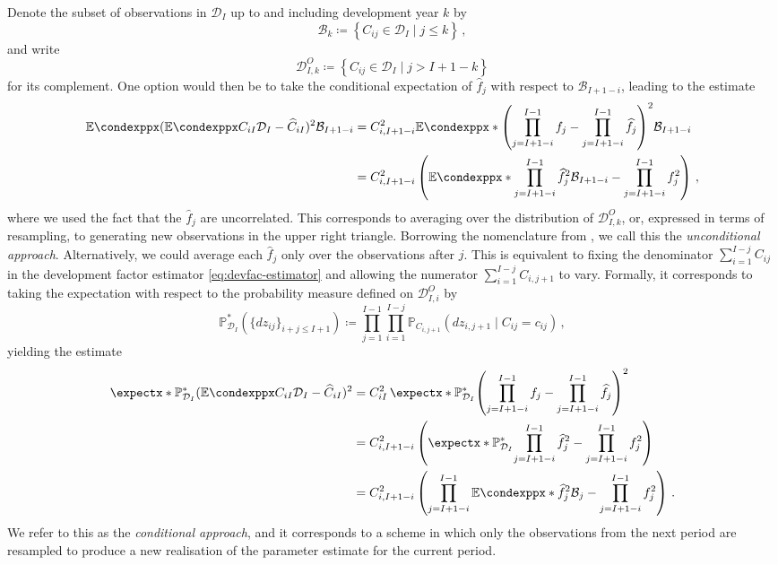 \documentclass[a4paper]{book}
\begin{document}
Denote the subset of observations in $\mathcal{D}_I$ up to and including development year $k$ by
\begin{equation}
    \mathcal{B}_k \coloneqq \left \{ C_{ij} \in \mathcal{D}_I \mid j \leq k \right \} \,,
\end{equation}
and write
\begin{equation}
    \mathcal{D}^O_{I, k} \coloneqq \left \{ C_{ij} \in \mathcal{D}_I \mid j > I + 1 - k \right \}
\end{equation}
for its complement. One option would then be to take the conditional expectation of $\widehat{f}_j$ with respect to $\mathcal{B}_{I+1-i}$, leading to the estimate
\begin{align} \label{eq:uncond-param-err}
    \condexpp{(\condexpp{C_{iI}}{\mathcal{D}_I} - \widehat{C}_{iI})^2}{\mathcal{B}_{I+1-i}} &= C^2_{i, I+1-i} \condexpp*{\left( \prod_{j=I+1-i}^{I-1}f_j - \prod_{j=I+1-i}^{I-1}\widehat{f}_j \right)^2}{\mathcal{B}_{I+1-i}} \\
    &= C^2_{i, I+1-i} \left( \condexpp*{\prod_{j=I+1-i}^{I-1}\widehat{f}^2_j}{\mathcal{B}_{I+1-i}} - \prod_{j=I+1-i}^{I-1}f^2_j \right)\,,
\end{align}
where we used the fact that the $\widehat{f}_j$ are uncorrelated. This corresponds to averaging over the distribution of $\mathcal{D}^O_{I, k}$, or, expressed in terms of resampling, to generating new observations in the upper right triangle. Borrowing the nomenclature from \cite{wuthrich:chain-ladder-msep}, we call this the \emph{unconditional approach}. Alternatively, we could average each $\widehat{f}_j$ only over the observations after $j$. This is equivalent to fixing the denominator $\sum_{i = 1}^{I - j} C_{ij}$ in the development factor estimator \cref{eq:devfac-estimator} and allowing the numerator $\sum_{i = 1}^{I - j} C_{i, j + 1}$ to vary. Formally, it corresponds to taking the expectation with respect to the probability measure defined on $\mathcal{D}^O_{I, i}$ by
\begin{equation}
  \mathbb{P}^*_{\mathcal{D}_I}(\{ dz_{ij} \}_{i + j \leq I + 1}) \coloneqq \prod_{j = 1}^{I - 1} \prod_{i = 1}^{I - j}  \mathbb{P}_{C_{i, j + 1}}(dz_{i, j + 1} \mid C_{ij} = c_{ij}) \,,
\end{equation}
yielding the estimate
\begin{align}
    \expect[\mathbb{P}^*_{\mathcal{D}_I}]{(\condexpp{C_{iI}}{\mathcal{D}_I} - \widehat{C}_{iI})^2}&= C^2_{iI} \, \expect[\mathbb{P}^*_{\mathcal{D}_I}]{\left( \prod_{j=I+1-i}^{I-1}f_j - \prod_{j=I+1-i}^{I-1}\widehat{f}_j \right)^2} \\ 
    &= C^2_{i, I+1-i} \left( \expect[\mathbb{P}^*_{\mathcal{D}_I}]{\prod_{j=I+1-i}^{I-1}\widehat{f}^2_j} - \prod_{j=I+1-i}^{I-1}f^2_j \right) \\
    &= C^2_{i, I+1-i} \left( \prod_{j=I+1-i}^{I-1} \condexpp*{\widehat{f}^2_j}{\mathcal{B}_j} - \prod_{j=I+1-i}^{I-1}f^2_j \right) \,.
\end{align}
We refer to this as the \emph{conditional approach}, and it corresponds to a scheme in which only the observations from the next period are resampled to produce a new realisation of the parameter estimate for the current period.
\end{document}
